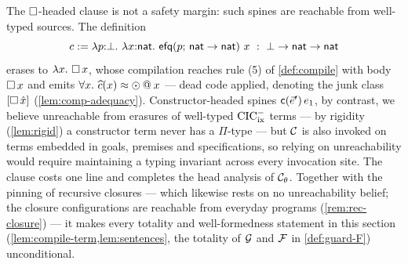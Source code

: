 \begin{remark}
\label{rem:box-head}
The $\square$-headed clause is not a safety margin: such spines are
reachable from well-typed sources.  The definition
\[
  c \mathrel{:=} \lambda p{:}\bot.\ \lambda x{:}\mathsf{nat}.\
  \mathsf{efq}(p;\,\mathsf{nat} \to \mathsf{nat})\ x \ : \ \bot \to \mathsf{nat} \to \mathsf{nat}
\]
erases to $\lambda x.\ \square\,x$, whose compilation reaches rule (5) of
\cref{def:compile} with body $\square\,x$ and emits $\forall x.\
\widehat{c}(x) \approx \odot \mathbin{@} x$ --- dead code applied, denoting the
junk class $[\square\,\hat{x}]$ (\cref{lem:comp-adequacy}).
Constructor-headed spines $\mathsf{c}(\vec{e}')\,e_1$, by contrast, we
believe unreachable from erasures of well-typed $\mathrm{CIC}^{-}_{\mathrm{ix}}$ terms --- by
rigidity (\cref{lem:rigid}) a constructor term never has a $\Pi$-type
--- but $\mathcal{C}$ is also invoked on terms embedded in goals, premises
and specifications, so relying on unreachability would require
maintaining a typing invariant across every invocation site.  The
clause costs one line and completes the head analysis of
$\mathcal{C}_\theta$.  Together with the pinning of recursive closures ---
which likewise rests on no unreachability belief; the closure
configurations are reachable from everyday programs
(\cref{rem:rec-closure}) --- it makes every totality and
well-formedness statement in this section
(\cref{lem:compile-term,lem:sentences}, the totality of $\mathcal{G}$ and
$\mathcal{F}$ in \cref{def:guard-F}) unconditional.
\end{remark}

